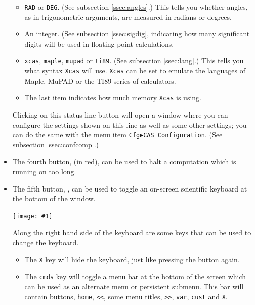 \documentclass[a4paper,11pt]{book}
\newcommand{\includeimage}[1]
{\texttt{[image: \#1]}}
\begin{document}
\begin{itemize}
\begin{itemize}
    \item \texttt{RAD} or \texttt{DEG}.  
    (See subsection \ref{ssec:angles}.)
    This tells you whether
    angles, as in trigonometric arguments, are measured in radians
    or degrees.

    \item An integer.  (See subsection \ref{ssec:sigdig}, indicating
    how many significant digits will be used in floating point calculations.

    \item \texttt{xcas}, \texttt{maple}, \texttt{mupad} or \texttt{ti89}.
    (See subsection \ref{ssec:lang}.) This tells you what syntax
    \texttt{Xcas} will use.  \texttt{Xcas} can be set to emulate the
    languages of Maple, MuPAD or the TI89 series of calculators.

    \item The last item indicates how much memory \texttt{Xcas} is using.
  \end{itemize}
  Clicking on this status line button will open a window where
  you can configure the settings shown on this line as well as some
  other settings; you can do the same with the menu item
  \texttt{Cfg$\blacktriangleright$CAS Configuration}.
  (See subsection \ref{ssec:confcomp}.)      

  \item The fourth button,  (in red), can be used
  to halt a computation which is running on too long.

  \item The fifth button, , can be used to toggle an
  on-screen scientific keyboard at the bottom of the window.
  \begin{center}
    \includeimage{xcas-scientific-keyboard.png}
  \end{center}
  Along the right hand side of the keyboard are some keys that can
  be used to change the keyboard.  
  \begin{itemize}
    \item The \texttt{X} key will hide the
    keyboard, just like pressing the  button again.

    \item The \texttt{cmds} key will toggle a menu bar at the bottom of the
    screen which can be used as an alternate menu or persistent
    submenu.  This bar will contain buttons, \texttt{home},
    \texttt{<{}<}, some menu titles, \texttt{>{}>}, \texttt{var},
    \texttt{cust} and \texttt{X}.


\end{itemize}
\end{itemize}
\end{document}
